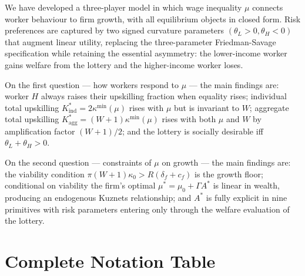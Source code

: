 \documentclass[12pt,a4paper]{article}
\begin{document}
We have developed a three-player model in which wage inequality $\mu$
connects worker behaviour to firm growth, with all equilibrium objects
in closed form. Risk preferences are captured by two signed curvature
parameters $(\theta_L > 0, \theta_H < 0)$ that augment linear utility,
replacing the three-parameter Friedman-Savage specification while
retaining the essential asymmetry: the lower-income worker gains welfare
from the lottery and the higher-income worker loses.

On the first question --- how workers respond to $\mu$ --- the main
findings are: worker $H$ always raises their upskilling fraction when
equality rises; individual total upskilling $K^*_{\mathrm{ind}} =
2\kappa^{\min}(\mu)$ rises with $\mu$ but is invariant to $W$;
aggregate total upskilling $K^*_{\mathrm{agg}} = (W+1)\kappa^{\min}(\mu)$
rises with both $\mu$ and $W$ by amplification factor $(W+1)/2$; and
the lottery is socially desirable iff $\theta_L + \theta_H > 0$.

On the second question --- constraints of $\mu$ on growth --- the main
findings are: the viability condition $\pi(W+1)\kappa_0 > R(\delta_f+c_f)$
is the growth floor; conditional on viability the firm's optimal
$\mu^* = \mu_0 + \Gamma A^*$ is linear in wealth, producing an
endogenous Kuznets relationship; and $A^*$ is fully explicit in nine
primitives with risk parameters entering only through the welfare
evaluation of the lottery.

\appendix
\section{Complete Notation Table}
\end{document}
